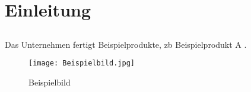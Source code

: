 
\section{Einleitung}
\subsection{\Unternehmen{}}
Das Unternehmen \Unternehmen{} fertigt Beispielprodukte, \acrshort{zb} Beispielprodukt A \cite{ctan}.

\begin{figure}[!h]
    \centering
    \texttt{[image: Beispielbild.jpg]}
    \caption{Beispielbild}
\end{figure}